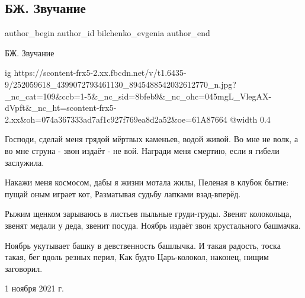  
 
 
 
 
 
\subsection{БЖ. Звучание}
\label{sec:01_11_2021.fb.bilchenko_evgenia.1.zvuchanie}
 
\ifcmt
 author_begin
   author_id bilchenko_evgenia
 author_end
\fi

БЖ. Звучание

\ifcmt
  ig https://scontent-frx5-2.xx.fbcdn.net/v/t1.6435-9/252059618_4399072793461130_8945488542032612770_n.jpg?_nc_cat=109&ccb=1-5&_nc_sid=8bfeb9&_nc_ohc=045mgL_VlegAX-dVpft&_nc_ht=scontent-frx5-2.xx&oh=074a367333ad7af1c927f769ea8d2a52&oe=61A87664
  @width 0.4
\fi

Господи, сделай меня грядой мёртвых каменьев, водой живой.
Во мне не волк, а во мне струна - звон издаёт - не вой.
Награди меня смертию, если я гибели заслужила.

Накажи меня космосом, дабы я жизни мотала жилы,
Пеленая в клубок бытие: пущай оным играет кот,
Разматывая судьбу лапками взад-вперёд.

Рыжим щенком зарываюсь в листьев пыльные груди-груды.
Звенят колокольца, звенят медали у деда, звенит посуда.
Ноябрь издаёт звон хрустального башмачка.

Ноябрь укутывает башку в девственность башлычка.
И такая радость, тоска такая, бег вдоль резных перил,
Как будто Царь-колокол, наконец, нищим заговорил.

1 ноября 2021 г.
